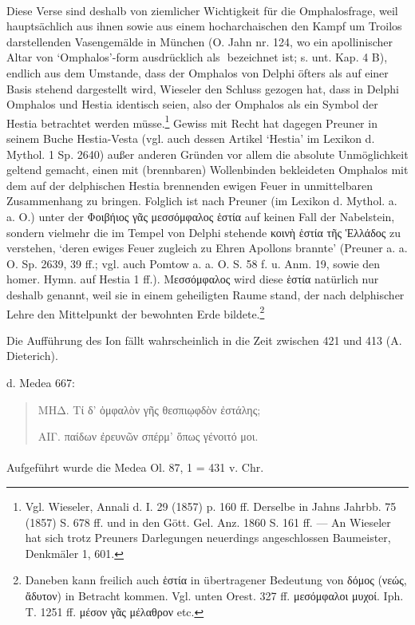 \documentclass[a4paper, 11pt, oneside]{article}
\newcommand*\svgAAL{}
\begin{document}
\paragraph{}
Diese Verse sind deshalb von ziemlicher Wichtigkeit für die Omphalosfrage, weil hauptsächlich aus ihnen sowie aus einem hocharchaischen den Kampf um Troilos darstellenden Vasengemälde in München (O. Jahn nr. 124, wo ein apollinischer Altar von `Omphalos'-form ausdrücklich als $\svgAAL$ bezeichnet ist; s. unt. Kap. 4 B), endlich aus dem Umstande, dass der Omphalos von Delphi öfters als auf einer Basis stehend dargestellt wird, Wieseler den Schluss gezogen hat, dass in Delphi Omphalos und Hestia identisch seien, also der Omphalos als ein Symbol der Hestia betrachtet werden müsse.\footnote{Vgl. Wieseler, Annali d. I. 29 (1857) p. 160 ff. Derselbe in Jahns Jahrbb. 75 (1857) S. 678 ff. und in den Gött. Gel. Anz. 1860 S. 161 ff. --- An Wieseler hat sich trotz Preuners Darlegungen neuerdings angeschlossen Baumeister, Denkmäler 1, 601.} Gewiss mit Recht hat dagegen Preuner in seinem Buche Hestia-Vesta (vgl. auch dessen Artikel `Hestia' im Lexikon d. Mythol. 1 Sp. 2640) außer anderen Gründen vor allem die absolute Unmöglichkeit geltend gemacht, einen mit (brennbaren) Wollenbinden bekleideten Omphalos mit dem auf der delphischen Hestia brennenden ewigen Feuer in unmittelbaren Zusammenhang zu bringen. Folglich ist nach Preuner (im Lexikon d. Mythol. a. a. O.) unter der Φοιβήιος γᾶς μεσσόμφαλος ἑστία auf keinen Fall der Nabelstein, sondern vielmehr die im Tempel von Delphi stehende κοινὴ ἑστία τῆς Ἑλλάδος zu verstehen, `deren ewiges Feuer zugleich zu Ehren Apollons brannte' (Preuner a. a. O. Sp. 2639, 39 ff.; vgl. auch Pomtow a. a. O. S. 58 f. u. Anm. 19, sowie den homer. Hymn. auf Hestia 1 ff.). Μεσσόμφαλος wird diese ἑστία natürlich nur deshalb genannt, weil sie in einem geheiligten Raume stand, der nach delphischer Lehre den Mittelpunkt der bewohnten Erde bildete.\footnote{Daneben kann freilich auch ἑστία in übertragener Bedeutung von δόμος (νεώς, ἄδυτον) in Betracht kommen. Vgl. unten Orest. 327 ff. μεσόμφαλοι μυχοί. Iph. T. 1251 ff. μέσον γᾶς μέλαθρον etc.}

Die Aufführung des Ion fällt wahrscheinlich in die Zeit zwischen 421 und 413 (A. Dieterich).

d. Medea 667:
\begin{quotation}
ΜΗΔ. Τί δ' ὀμφαλὸν γῆς θεσπιῳφδὸν ἐστάλης;

ΑΙΓ. παίδων ἐρευνῶν σπέρμ' ὅπως γένοιτό μοι.
\end{quotation}
\paragraph{}
Aufgeführt wurde die Medea Ol. 87, 1 = 431 v. Chr.
\end{document}
